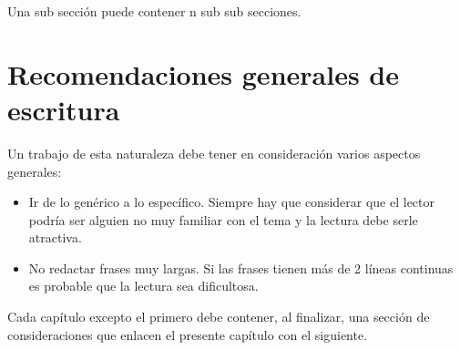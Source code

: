 Una sub sección puede contener n sub sub secciones.

\section{Recomendaciones generales de escritura}
Un trabajo de esta naturaleza debe tener en consideración varios aspectos generales:

\begin{itemize}
\item Ir de lo genérico a lo específico. Siempre hay que considerar que el lector podría ser alguien no muy familiar con el tema
	y la lectura debe serle atractiva.
\item No redactar frases muy largas. Si las frases tienen más de 2 líneas continuas es probable que la lectura sea dificultosa.
\end{itemize}

Cada capítulo excepto el primero debe contener, al finalizar, una sección de consideraciones que enlacen el presente capítulo con el siguiente.
